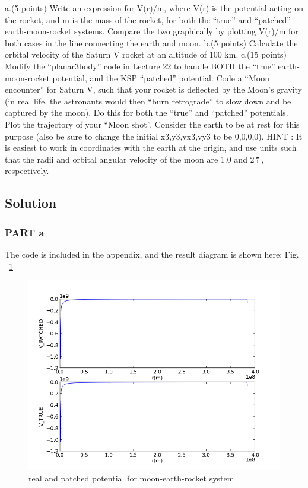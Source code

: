 \documentclass[11pt,letterpaper]{article}
\begin{document}
a.(5 points) Write an expression for V(r)/m,
where V(r) is the potential acting on the
rocket, and m is the mass of the rocket, for both the “true” and
“patched” earth-moon-rocket systems. Compare the two graphically by
plotting V(r)/m for both cases in the line connecting the earth and
moon.
b.(5 points) Calculate the orbital velocity of the Saturn V rocket at an
altitude of 100 km.
c.(15 points) Modify the “planar3body” code in Lecture 22 to handle
BOTH the “true” earth-moon-rocket potential, and the KSP “patched”
potential. Code a “Moon encounter” for Saturn V, such that your rocket
is deflected by the Moon’s gravity (in real life, the astronauts would
then “burn retrograde” to slow down and be captured by the moon). Do
this for both the “true” and “patched” potentials. Plot the trajectory of
your “Moon shot”. 
Consider the earth to be at rest for this purpose (also be sure to
change the initial x3,y3,vx3,vy3 to be 0,0,0,0). 
HINT : It is easiest to work in coordinates with the earth at the origin,
and use units such that the radii and orbital angular velocity of the
moon are 1.0 and 2⇡, respectively.

\subsection{Solution}
\subsubsection{PART a}

The code is included in the appendix, and the result diagram is shown here: Fig. ~\ref{figure3}

\begin{figure}
\begin{center}
\includegraphics[width=0.8\linewidth,angle=0]{p2a.png}
\caption{real and patched potential for moon-earth-rocket system}
\label{figure3}
\end{center}
\end{figure}
\end{document}
